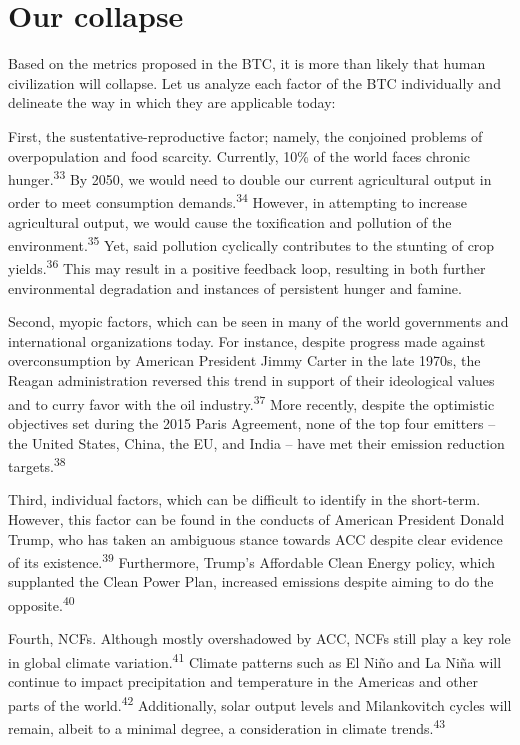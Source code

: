 \documentclass[12pt]{article}
\begin{document}
\section{Our collapse}

Based on the metrics proposed in the BTC, it is more than likely that human civilization will collapse. Let us analyze each factor of the BTC individually and delineate the way in which they are applicable today:

First, the sustentative-reproductive factor; namely, the conjoined problems of overpopulation and food scarcity. Currently, 10\% of the world faces chronic hunger.\textsuperscript{33} By 2050, we would need to double our current agricultural output in order to meet consumption demands.\textsuperscript{34} However, in attempting to increase agricultural output, we would cause the toxification and pollution of the environment.\textsuperscript{35} Yet, said pollution cyclically contributes to the stunting of crop yields.\textsuperscript{36} This may result in a positive feedback loop, resulting in both further environmental degradation and instances of persistent hunger and famine.

Second, myopic factors, which can be seen in many of the world governments and international organizations today. For instance, despite progress made against overconsumption by American President Jimmy Carter in the late 1970s, the Reagan administration reversed this trend in support of their ideological values and to curry favor with the oil industry.\textsuperscript{37} More recently, despite the optimistic objectives set during the 2015 Paris Agreement, none of the top four emitters -- the United States, China, the EU, and India -- have met their emission reduction targets.\textsuperscript{38}

Third, individual factors, which can be difficult to identify in the short-term. However, this factor can be found in the conducts of American President Donald Trump, who has taken an ambiguous stance towards ACC despite clear evidence of its existence.\textsuperscript{39} Furthermore, Trump’s Affordable Clean Energy policy, which supplanted the Clean Power Plan, increased emissions despite aiming to do the opposite.\textsuperscript{40}

Fourth, NCFs. Although mostly overshadowed by ACC, NCFs still play a key role in global climate variation.\textsuperscript{41} Climate patterns such as El Ni\~no and La Ni\~na will continue to impact precipitation and temperature in the Americas and other parts of the world.\textsuperscript{42} Additionally, solar output levels and Milankovitch cycles will remain, albeit to a minimal degree, a consideration in climate trends.\textsuperscript{43}
\end{document}
